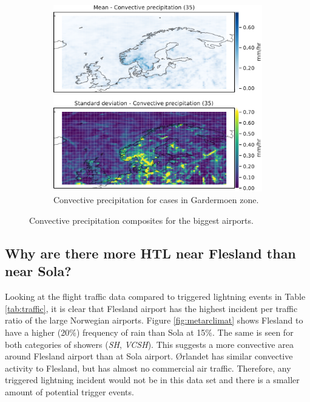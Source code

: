 \begin{figure}[H]
    \begin{subfigure}[b]{0.5\textwidth}
    \centering
    \includegraphics[width=\textwidth]{Figures/cPENGM.pdf}
    \caption{Convective precipitation for cases in Gardermoen zone.}
    \label{fig:ENGMcP}
\end{subfigure}
\caption{Convective precipitation composites for the biggest airports. }
\label{fig:convectiveairports}
\end{figure}

\subsection{Why are there more HTL near Flesland than near Sola?}

Looking at the flight traffic data compared to triggered lightning events in Table \ref{tab:traffic}, it is clear that Flesland airport has the highest incident per traffic ratio of the large Norwegian airports. 
Figure \ref{fig:metarclimat} shows Flesland to have a higher (20$\%$) frequency of rain than Sola at 15$\%$. The same is seen for both categories of showers (\textit{SH}, \textit{VCSH}). This suggests a more convective area around Flesland airport than at Sola airport. Ørlandet has similar convective activity to Flesland, but has almost no commercial air traffic. Therefore, any triggered lightning incident would not be in this data set and there is a smaller amount of potential trigger events. 

